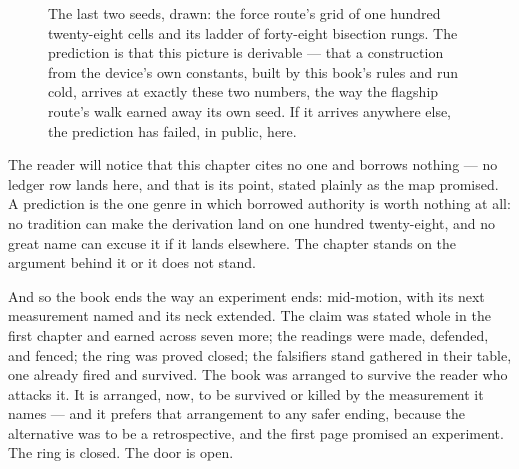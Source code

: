\begin{figure}[htbp]
\centering
{}
\caption{The last two seeds, drawn: the force route's grid of one hundred
twenty-eight cells and its ladder of forty-eight bisection rungs. The prediction
is that this picture is derivable --- that a construction from the device's own
constants, built by this book's rules and run cold, arrives at exactly these two
numbers, the way the flagship route's walk earned away its own seed. If it
arrives anywhere else, the prediction has failed, in public, here.}
\end{figure}

The reader will notice that this chapter cites no one and borrows nothing --- no
ledger row lands here, and that is its point, stated plainly as the map promised.
A prediction is the one genre in which borrowed authority is worth nothing at
all: no tradition can make the derivation land on one hundred twenty-eight, and
no great name can excuse it if it lands elsewhere. The chapter stands on the
argument behind it or it does not stand.

And so the book ends the way an experiment ends: mid-motion, with its next
measurement named and its neck extended. The claim was stated whole in the first
chapter and earned across seven more; the readings were made, defended, and
fenced; the ring was proved closed; the falsifiers stand gathered in their
table, one already fired and survived. The book was arranged to survive the
reader who attacks it. It is arranged, now, to be survived or killed by the
measurement it names --- and it prefers that arrangement to any safer ending,
because the alternative was to be a retrospective, and the first page promised
an experiment. The ring is closed. The door is open.
